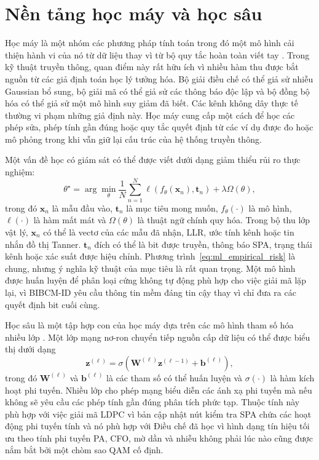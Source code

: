 \section{Nền tảng học máy và học sâu}
Học máy là một nhóm các phương pháp tính toán trong đó một mô hình cải thiện hành vi của nó từ dữ liệu thay vì từ bộ quy tắc hoàn toàn viết tay \cite{bishop2006}. Trong kỹ thuật truyền thông, quan điểm này rất hữu ích vì nhiều hàm thu được bắt nguồn từ các giả định toán học lý tưởng hóa. Bộ giải điều chế có thể giả sử nhiễu Gaussian bổ sung, bộ giải mã có thể giả sử các thông báo độc lập và bộ đồng bộ hóa có thể giả sử một mô hình suy giảm đã biết. Các kênh không dây thực tế thường vi phạm những giả định này. Học máy cung cấp một cách để học các phép sửa, phép tính gần đúng hoặc quy tắc quyết định từ các ví dụ được đo hoặc mô phỏng trong khi vẫn giữ lại cấu trúc của hệ thống truyền thông.

Một vấn đề học có giám sát có thể được viết dưới dạng giảm thiểu rủi ro thực nghiệm:
\begin{equation}
\label{eq:ml_empirical_risk}
\theta^\star=\arg\min_{\theta}\frac{1}{N}\sum_{n=1}^{N}
\ell\!\left(f_{\theta}(\mathbf{x}_n),\mathbf{t}_n\right)
+\lambda\Omega(\theta),
\end{equation}
trong đó $\mathbf{x}_n$ là mẫu đầu vào, $\mathbf{t}_n$ là mục tiêu mong muốn, $f_{\theta}(\cdot)$ là mô hình, $\ell(\cdot)$ là hàm mất mát và $\Omega(\theta)$ là thuật ngữ chính quy hóa. Trong bộ thu lớp vật lý, $\mathbf{x}_n$ có thể là vectơ của các mẫu đã nhận, LLR, ước tính kênh hoặc tin nhắn đồ thị Tanner. $\mathbf{t}_n$ đích có thể là bit được truyền, thông báo SPA, trạng thái kênh hoặc xác suất được hiệu chỉnh. Phương trình~\eqref{eq:ml_empirical_risk} là chung, nhưng ý nghĩa kỹ thuật của mục tiêu là rất quan trọng. Một mô hình được huấn luyện để phân loại cứng không tự động phù hợp cho việc giải mã lặp lại, vì BIBCM-ID yêu cầu thông tin mềm đáng tin cậy thay vì chỉ đưa ra các quyết định bit cuối cùng.

Học sâu là một tập hợp con của học máy dựa trên các mô hình tham số hóa nhiều lớp \cite{lecun2015,goodfellow2016}. Một lớp mạng nơ-ron chuyển tiếp nguồn cấp dữ liệu có thể được biểu thị dưới dạng
\begin{equation}
\label{eq:nn_layer_ch1}
\mathbf{z}^{(\ell)}=\sigma\!\left(\mathbf{W}^{(\ell)}\mathbf{z}^{(\ell-1)}+\mathbf{b}^{(\ell)}\right),
\end{equation}
trong đó $\mathbf{W}^{(\ell)}$ và $\mathbf{b}^{(\ell)}$ là các tham số có thể huấn luyện và $\sigma(\cdot)$ là hàm kích hoạt phi tuyến. Nhiều lớp cho phép mạng biểu diễn các ánh xạ phi tuyến mà nếu không sẽ yêu cầu các phép tính gần đúng phân tích phức tạp. Thuộc tính này phù hợp với việc giải mã LDPC vì bản cập nhật nút kiểm tra SPA chứa các hoạt động phi tuyến tính và nó phù hợp với Điều chế đã học vì hình dạng tín hiệu tối ưu theo tính phi tuyến PA, CFO, mờ dần và nhiễu không phải lúc nào cũng được nắm bắt bởi một chòm sao QAM cố định.

